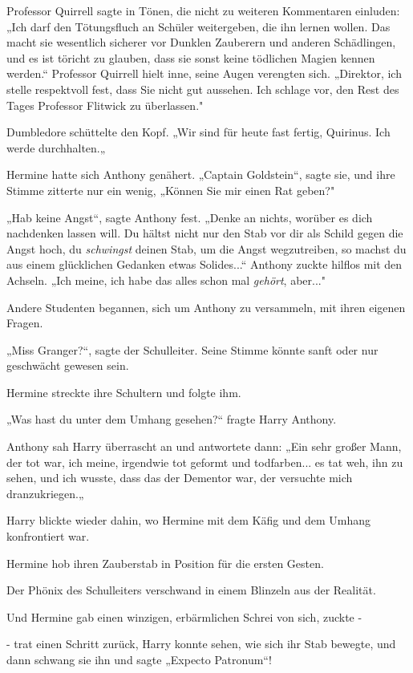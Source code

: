 {Professor Quirrell sagte in Tönen, die nicht zu weiteren Kommentaren einluden: „Ich darf den Tötungsfluch an Schüler weitergeben, die ihn lernen wollen. Das macht sie wesentlich sicherer vor Dunklen Zauberern und anderen Schädlingen, und es ist töricht zu glauben, dass sie sonst keine tödlichen Magien kennen werden.“ Professor Quirrell hielt inne, seine Augen verengten sich. „Direktor, ich stelle respektvoll fest, dass Sie nicht gut aussehen. Ich schlage vor, den Rest des Tages Professor Flitwick zu überlassen."

Dumbledore schüttelte den Kopf. „Wir sind für heute fast fertig, Quirinus. Ich werde durchhalten.„

Hermine hatte sich Anthony genähert. „Captain Goldstein“, sagte sie, und ihre Stimme zitterte nur ein wenig, „Können Sie mir einen Rat geben?"

„Hab keine Angst“, sagte Anthony fest. „Denke an nichts, worüber es dich nachdenken lassen will. Du hältst nicht nur den Stab vor dir als Schild gegen die Angst hoch, du \emph{schwingst} deinen Stab, um die Angst wegzutreiben, so machst du aus einem glücklichen Gedanken etwas Solides...“ Anthony zuckte hilflos mit den Achseln. „Ich meine, ich habe das alles schon mal \emph{gehört}, aber..."

Andere Studenten begannen, sich um Anthony zu versammeln, mit ihren eigenen Fragen.

„Miss Granger?“, sagte der Schulleiter. Seine Stimme könnte sanft oder nur geschwächt gewesen sein.

Hermine streckte ihre Schultern und folgte ihm.

„Was hast du unter dem Umhang gesehen?“ fragte Harry Anthony.

Anthony sah Harry überrascht an und antwortete dann: „Ein sehr großer Mann, der tot war, ich meine, irgendwie tot geformt und todfarben... es tat weh, ihn zu sehen, und ich wusste, dass das der Dementor war, der versuchte mich dranzukriegen.„

Harry blickte wieder dahin, wo Hermine mit dem Käfig und dem Umhang konfrontiert war.

Hermine hob ihren Zauberstab in Position für die ersten Gesten.

Der Phönix des Schulleiters verschwand in einem Blinzeln aus der Realität.

Und Hermine gab einen winzigen, erbärmlichen Schrei von sich, zuckte -

- trat einen Schritt zurück, Harry konnte sehen, wie sich ihr Stab bewegte, und dann schwang sie ihn und sagte „Expecto Patronum“!

}
